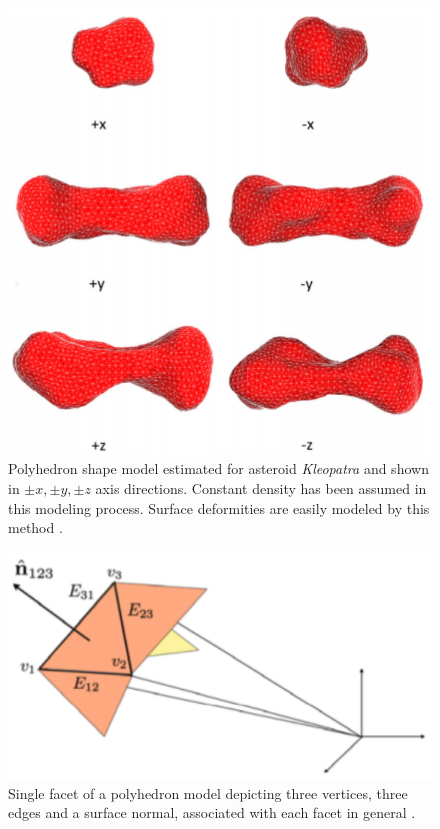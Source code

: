 \begin{figure}[htb]
\centering
\captionsetup{justification=centering}
\includegraphics[width=\textwidth, height=0.3\textheight, keepaspectratio=true]{polyhedra_example.pdf}
\caption{Polyhedron shape model estimated for asteroid \textit{Kleopatra} and shown in $\pm x, \pm y, \pm z$ axis directions. Constant density has been assumed in this modeling process. Surface deformities are easily modeled by this method \parencite{polyhedra_example}.}
\label{fig:polyhedron_example}
\end{figure}
\FloatBarrier
\begin{figure}[htb]
\centering
\captionsetup{justification=centering}
\includegraphics[width=\textwidth, height=0.2\textheight, keepaspectratio=true]{single_facet.pdf}
\caption{Single facet of a polyhedron model depicting three vertices, three edges and a surface normal, associated with each facet in general \parencite{scheeresBook}.}
\label{fig:single_facet}
\end{figure}
